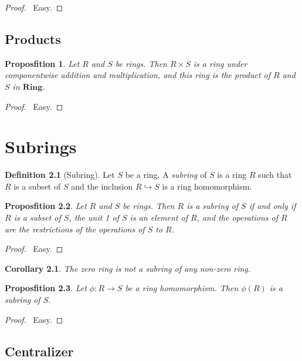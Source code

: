 \documentclass{book}
\let\qed\relax
\newtheorem{prop}{Proposfition}[chapter]
\newtheorem{cor}{Corollary}[prop]
\theoremstyle{definition}
\newtheorem{df}[prop]{Definition}
\newcommand{\Ring}{\ensuremath{\mathbf{Ring}}}
\begin{document}
\begin{proof}
\pf\ Easy. \qed
\end{proof}
 
\section{Products}

\begin{prop}
Let $R$ and $S$ be rings. Then $R \times S$ is a ring under componentwise addition and multiplication, and this ring is the product of $R$ and $S$ in $\Ring$.
\end{prop}

\begin{proof}
\pf\ Easy. \qed
\end{proof}


\chapter{Subrings}

\begin{df}[Subring]
Let $S$ be a ring. A \emph{subring} of $S$ is a ring $R$ such that $R$ is a subset of $S$ and the inclusion $R \hookrightarrow S$ is a ring homomorphism.
\end{df}

\begin{prop}
Let $R$ and $S$ be rings. Then $R$ is a subring of $S$ if and only if $R$ is a subset of $S$, the unit 1 of $S$ is an element of $R$, and the operations of $R$ are the restrictions of the operations of $S$ to $R$.
\end{prop}

\begin{proof}
\pf\ Easy. \qed
\end{proof}

\begin{cor}
The zero ring is not a subring of any non-zero ring.
\end{cor}

\begin{prop}
Let $\phi : R \rightarrow S$ be a ring homomorphism. Then $\phi(R)$ is a subring of $S$.
\end{prop}

\begin{proof}
\pf\ Easy. \qed
\end{proof}

\section{Centralizer}
\end{document}
